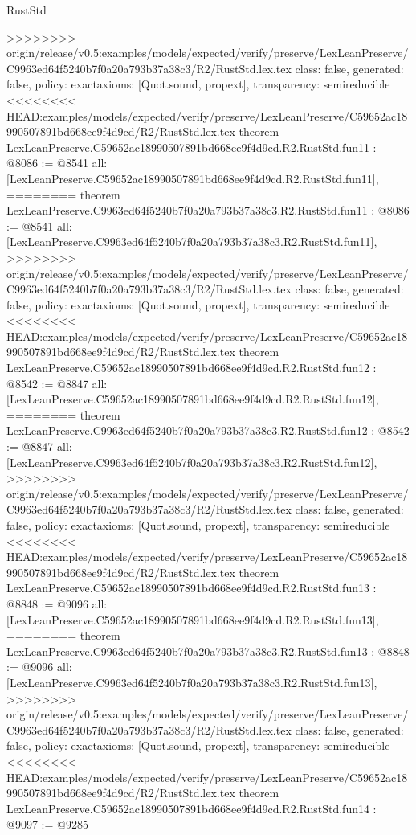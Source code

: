 \begin{lexlean}{RustStd}
\begin{coremodule}
{\begin{coremodule}
{{{{{{{{{{{{{{>>>>>>>> origin/release/v0.5:examples/models/expected/verify/preserve/LexLeanPreserve/C9963ed64f5240b7f0a20a793b37a38c3/R2/RustStd.lex.tex
  class: false,
  generated: false,
  policy: exact{axioms: [Quot.sound, propext]},
  transparency: semireducible
}
<<<<<<<< HEAD:examples/models/expected/verify/preserve/LexLeanPreserve/C59652ac18990507891bd668ee9f4d9cd/R2/RustStd.lex.tex
theorem LexLeanPreserve.C59652ac18990507891bd668ee9f4d9cd.R2.RustStd.fun11 : @8086 := @8541 {
  all: [LexLeanPreserve.C59652ac18990507891bd668ee9f4d9cd.R2.RustStd.fun11],
========
theorem LexLeanPreserve.C9963ed64f5240b7f0a20a793b37a38c3.R2.RustStd.fun11 : @8086 := @8541 {
  all: [LexLeanPreserve.C9963ed64f5240b7f0a20a793b37a38c3.R2.RustStd.fun11],
>>>>>>>> origin/release/v0.5:examples/models/expected/verify/preserve/LexLeanPreserve/C9963ed64f5240b7f0a20a793b37a38c3/R2/RustStd.lex.tex
  class: false,
  generated: false,
  policy: exact{axioms: [Quot.sound, propext]},
  transparency: semireducible
}
<<<<<<<< HEAD:examples/models/expected/verify/preserve/LexLeanPreserve/C59652ac18990507891bd668ee9f4d9cd/R2/RustStd.lex.tex
theorem LexLeanPreserve.C59652ac18990507891bd668ee9f4d9cd.R2.RustStd.fun12 : @8542 := @8847 {
  all: [LexLeanPreserve.C59652ac18990507891bd668ee9f4d9cd.R2.RustStd.fun12],
========
theorem LexLeanPreserve.C9963ed64f5240b7f0a20a793b37a38c3.R2.RustStd.fun12 : @8542 := @8847 {
  all: [LexLeanPreserve.C9963ed64f5240b7f0a20a793b37a38c3.R2.RustStd.fun12],
>>>>>>>> origin/release/v0.5:examples/models/expected/verify/preserve/LexLeanPreserve/C9963ed64f5240b7f0a20a793b37a38c3/R2/RustStd.lex.tex
  class: false,
  generated: false,
  policy: exact{axioms: [Quot.sound, propext]},
  transparency: semireducible
}
<<<<<<<< HEAD:examples/models/expected/verify/preserve/LexLeanPreserve/C59652ac18990507891bd668ee9f4d9cd/R2/RustStd.lex.tex
theorem LexLeanPreserve.C59652ac18990507891bd668ee9f4d9cd.R2.RustStd.fun13 : @8848 := @9096 {
  all: [LexLeanPreserve.C59652ac18990507891bd668ee9f4d9cd.R2.RustStd.fun13],
========
theorem LexLeanPreserve.C9963ed64f5240b7f0a20a793b37a38c3.R2.RustStd.fun13 : @8848 := @9096 {
  all: [LexLeanPreserve.C9963ed64f5240b7f0a20a793b37a38c3.R2.RustStd.fun13],
>>>>>>>> origin/release/v0.5:examples/models/expected/verify/preserve/LexLeanPreserve/C9963ed64f5240b7f0a20a793b37a38c3/R2/RustStd.lex.tex
  class: false,
  generated: false,
  policy: exact{axioms: [Quot.sound, propext]},
  transparency: semireducible
}
<<<<<<<< HEAD:examples/models/expected/verify/preserve/LexLeanPreserve/C59652ac18990507891bd668ee9f4d9cd/R2/RustStd.lex.tex
theorem LexLeanPreserve.C59652ac18990507891bd668ee9f4d9cd.R2.RustStd.fun14 : @9097 := @9285 {
}}}}}}}}}}}}}}}}}
\end{coremodule}}
\end{coremodule}
\end{lexlean}

